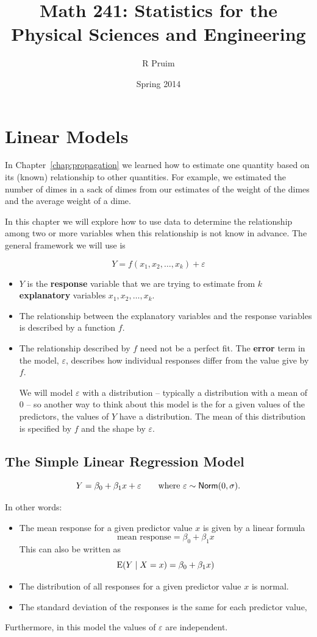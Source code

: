 \documentclass[twoside]{book}
\title{Math 241: Statistics for the Physical Sciences and Engineering}
\author{R Pruim}
\date{Spring 2014}
\def\term#1{\textbf{#1}}
\newcounter{example}[section]
\begin{document}
\chapter{Linear Models}

In Chapter~\ref{chap:propagation} we learned how to estimate one quantity based
on its (known) relationship to other quantities.  For example, we estimated the
number of dimes in a sack of dimes from our estimates of the weight of the
dimes and the average weight of a dime.  

In this chapter we will explore how to use data to determine the relationship among
two or more variables when this relationship is not know in advance.  The general
framework we will use is 

\[
Y = f(x_1, x_2, \dots, x_k) + \varepsilon
\]
\begin{itemize}
	\item $Y$ is the \term{response} variable that we are trying to estimate
		from $k$ \term{explanatory} variables $x_1, x_2, \dots, x_k$.
	\item
		The relationship between the explanatory variables and the response 
		variables is described by a function $f$.
	\item
		The relationship described by $f$ need not be a perfect fit.  The \term{error}
		term in the model, $\varepsilon$, describes how individual responses
		differ from the value give by $f$.  
		
		We will model $\varepsilon$ with a 
		distribution -- typically a distribution with a mean of 0 -- 
		so another way to think about this model is the for a given 
		values of the predictors, the values of $Y$ have a distribution.  The mean
		of this distribution is specified by $f$ and the shape by $\varepsilon$.
\end{itemize}


\section{The Simple Linear Regression Model}

\[
Y = \beta_0 + \beta_1 x + \varepsilon  \qquad \mbox{where $\varepsilon \sim {\textsf{Norm}}(0,\sigma)$.}
\]

In other words:
\begin{itemize}
\item
The mean response for a given predictor value $x$ is given by a linear formula
\[
\mbox{mean response} = \beta_0 + \beta_1 x
\]
This can also be written as 
\[
\operatorname{E}(Y \mid X=x) = \beta_0 + \beta_1 x)
\]
\item
The distribution of all responses for a given predictor value $x$ is normal.
\item
The standard deviation of the responses is the same for each predictor value,
\end{itemize}
Furthermore, in this model the values of $\varepsilon$ are independent.
\end{document}
